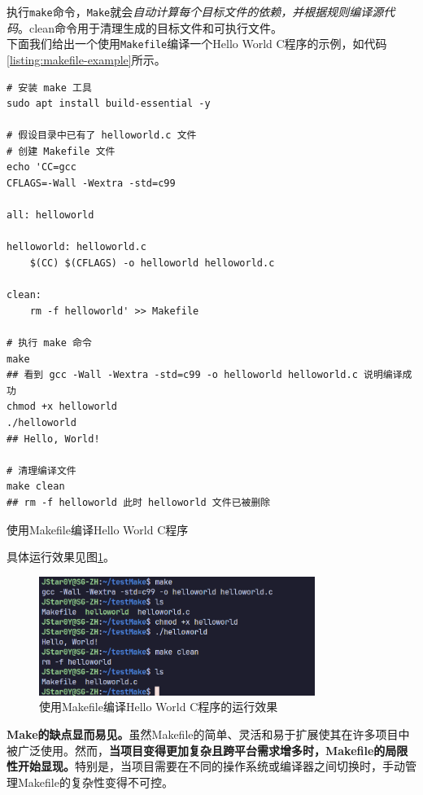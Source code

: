 执行\texttt{make}命令，\texttt{Make}就会\textit{自动计算每个目标文件的依赖，并根据规则编译源代码}。clean命令用于清理生成的目标文件和可执行文件。\\

下面我们给出一个使用\texttt{Makefile}编译一个Hello World C程序的示例，如代码\ref{listing:makefile-example}所示。

\begin{longlisting}
    \begin{verbatim}
# 安装 make 工具
sudo apt install build-essential -y

# 假设目录中已有了 helloworld.c 文件
# 创建 Makefile 文件
echo 'CC=gcc
CFLAGS=-Wall -Wextra -std=c99

all: helloworld

helloworld: helloworld.c
	$(CC) $(CFLAGS) -o helloworld helloworld.c

clean:
	rm -f helloworld' >> Makefile

# 执行 make 命令
make
## 看到 gcc -Wall -Wextra -std=c99 -o helloworld helloworld.c 说明编译成功
chmod +x helloworld
./helloworld
## Hello, World!

# 清理编译文件
make clean
## rm -f helloworld 此时 helloworld 文件已被删除
    \end{verbatim}
    \caption{使用Makefile编译Hello World C程序}
    \label{listing:makefile-example}
\end{longlisting}

具体运行效果见图\ref{fig:makefile-example}。

\begin{figure}[!htbp]
    \centering
    \includegraphics[width=0.8\textwidth]{Figures/make.png}
    \caption{使用Makefile编译Hello World C程序的运行效果}
    \label{fig:makefile-example}
\end{figure}

\textbf{Make的缺点显而易见。}虽然Makefile的简单、灵活和易于扩展使其在许多项目中被广泛使用。然而，\textbf{当项目变得更加复杂且跨平台需求增多时，Makefile的局限性开始显现。}特别是，当项目需要在不同的操作系统或编译器之间切换时，手动管理Makefile的复杂性变得不可控。

